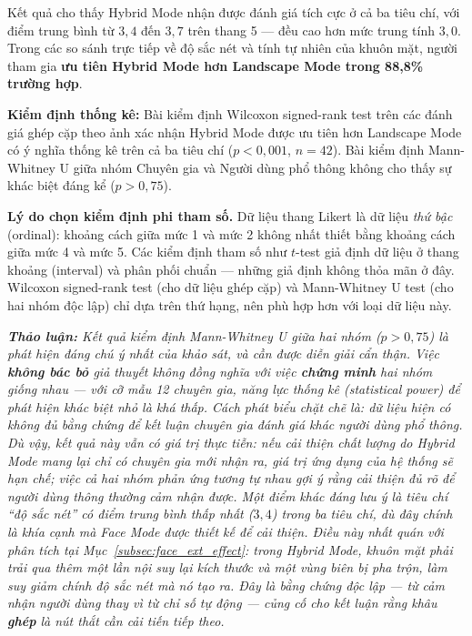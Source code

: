 Kết quả cho thấy Hybrid Mode nhận được đánh giá tích cực ở cả ba tiêu chí, với điểm trung bình từ $3{,}4$ đến $3{,}7$ trên thang 5 --- đều cao hơn mức trung tính $3{,}0$. Trong các so sánh trực tiếp về độ sắc nét và tính tự nhiên của khuôn mặt, người tham gia \textbf{ưu tiên Hybrid Mode hơn Landscape Mode trong 88,8\% trường hợp}.

\textbf{Kiểm định thống kê:} Bài kiểm định Wilcoxon signed-rank test trên các đánh giá ghép cặp theo ảnh xác nhận Hybrid Mode được ưu tiên hơn Landscape Mode có ý nghĩa thống kê trên cả ba tiêu chí ($p < 0{,}001$, $n = 42$). Bài kiểm định Mann-Whitney U giữa nhóm Chuyên gia và Người dùng phổ thông không cho thấy sự khác biệt đáng kể ($p > 0{,}75$).

\textbf{Lý do chọn kiểm định phi tham số.} Dữ liệu thang Likert là dữ liệu \textit{thứ bậc} (ordinal): khoảng cách giữa mức 1 và mức 2 không nhất thiết bằng khoảng cách giữa mức 4 và mức 5. Các kiểm định tham số như $t$-test giả định dữ liệu ở thang khoảng (interval) và phân phối chuẩn --- những giả định không thỏa mãn ở đây. Wilcoxon signed-rank test (cho dữ liệu ghép cặp) và Mann-Whitney U test (cho hai nhóm độc lập) chỉ dựa trên thứ hạng, nên phù hợp hơn với loại dữ liệu này.

\medskip
\noindent\textit{\textbf{Thảo luận:} Kết quả kiểm định Mann-Whitney U giữa hai nhóm ($p > 0{,}75$) là phát hiện đáng chú ý nhất của khảo sát, và cần được diễn giải cẩn thận. Việc \textbf{không bác bỏ} giả thuyết không đồng nghĩa với việc \textbf{chứng minh} hai nhóm giống nhau --- với cỡ mẫu 12 chuyên gia, năng lực thống kê (statistical power) để phát hiện khác biệt nhỏ là khá thấp. Cách phát biểu chặt chẽ là: \textit{dữ liệu hiện có không đủ bằng chứng để kết luận chuyên gia đánh giá khác người dùng phổ thông}. Dù vậy, kết quả này vẫn có giá trị thực tiễn: nếu cải thiện chất lượng do Hybrid Mode mang lại chỉ có chuyên gia mới nhận ra, giá trị ứng dụng của hệ thống sẽ hạn chế; việc cả hai nhóm phản ứng tương tự nhau gợi ý rằng cải thiện đủ rõ để người dùng thông thường cảm nhận được. Một điểm khác đáng lưu ý là tiêu chí ``độ sắc nét'' có điểm trung bình thấp nhất ($3{,}4$) trong ba tiêu chí, dù đây chính là khía cạnh mà Face Mode được thiết kế để cải thiện. Điều này nhất quán với phân tích tại Mục~\ref{subsec:face_ext_effect}: trong Hybrid Mode, khuôn mặt phải trải qua thêm một lần nội suy lại kích thước và một vùng biên bị pha trộn, làm suy giảm chính độ sắc nét mà nó tạo ra. Đây là bằng chứng độc lập --- từ cảm nhận người dùng thay vì từ chỉ số tự động --- củng cố cho kết luận rằng khâu \textbf{ghép} là nút thắt cần cải tiến tiếp theo.}

